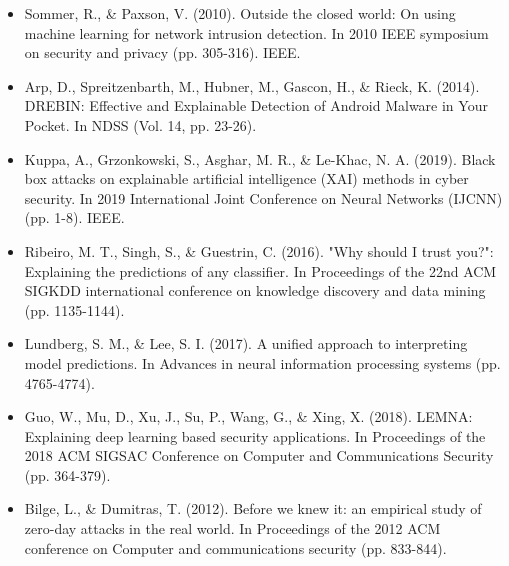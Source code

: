 \documentclass[12pt]{article}
\begin{document}
\begin{itemize}
\item Sommer, R., & Paxson, V. (2010). Outside the closed world: On using machine learning for network intrusion detection. In 2010 IEEE symposium on security and privacy (pp. 305-316). IEEE.
\end{itemize}

\begin{itemize}
\item Arp, D., Spreitzenbarth, M., Hubner, M., Gascon, H., & Rieck, K. (2014). DREBIN: Effective and Explainable Detection of Android Malware in Your Pocket. In NDSS (Vol. 14, pp. 23-26).
\end{itemize}

\begin{itemize}
\item Kuppa, A., Grzonkowski, S., Asghar, M. R., & Le-Khac, N. A. (2019). Black box attacks on explainable artificial intelligence (XAI) methods in cyber security. In 2019 International Joint Conference on Neural Networks (IJCNN) (pp. 1-8). IEEE.
\end{itemize}

\begin{itemize}
\item Ribeiro, M. T., Singh, S., & Guestrin, C. (2016). "Why should I trust you?": Explaining the predictions of any classifier. In Proceedings of the 22nd ACM SIGKDD international conference on knowledge discovery and data mining (pp. 1135-1144).
\end{itemize}

\begin{itemize}
\item Lundberg, S. M., & Lee, S. I. (2017). A unified approach to interpreting model predictions. In Advances in neural information processing systems (pp. 4765-4774).
\end{itemize}

\begin{itemize}
\item Guo, W., Mu, D., Xu, J., Su, P., Wang, G., & Xing, X. (2018). LEMNA: Explaining deep learning based security applications. In Proceedings of the 2018 ACM SIGSAC Conference on Computer and Communications Security (pp. 364-379).
\end{itemize}

\begin{itemize}
\item Bilge, L., & Dumitras, T. (2012). Before we knew it: an empirical study of zero-day attacks in the real world. In Proceedings of the 2012 ACM conference on Computer and communications security (pp. 833-844).
\end{itemize}
\end{document}
